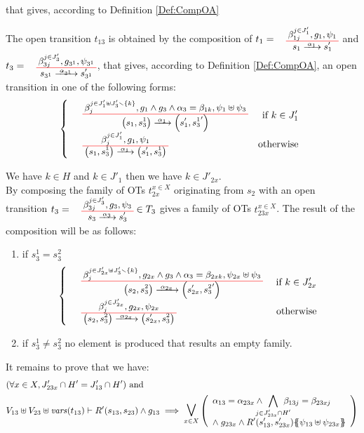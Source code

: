 \documentclass[runningheads]{llncs}
\begin{document}
\begin{enumerate}
\newpage

 that gives,  according to Definition \ref{Def:CompOA}

The open transition $t_{13}$ is obtained by the composition of $t_1=\OTx{1}{}{1}{1}$ and $t_3=\OTx{3^1}{}{3}{3}$, that gives,  according to Definition \ref{Def:CompOA}, an open transition in one of the following forms:
\[
\choice{
\OT{\mpar{s_1, s^1_3}}{\mpar{s'_1, {s^1_3}'}}{\alpha_1}{\beta_j^{j \in J'_1 \uplus J'_3 \setminus \{k\}}}{g_1 \wedge g_3 \wedge \alpha_3 = \beta_{1k}}{\psi_1 \uplus \psi_3} & \text{ if } k \in J'_{1} \\
\OT{\mpar{s_1, s^1_3}}{\mpar{s'_1, s^1_3}}{\alpha_1}{\beta_j^{j \in J'_1}}{g_1}{\psi_1}& \text{otherwise}
}
\]


We have  $k \in H$ and $k \in J'_{1}$ then  we have $k \in J'_{2x}$.\\
By composing the family of OTs  $t_{2x}^{x\in X}$ originating from  $s_2$ with an open transition $t_3=\OTx{3}{}{3}{3} \in T_3$
gives a family of OTs $t_{23x}^{x\in X}$.  The result of the composition will be as follows:
\begin{enumerate}
\item if $ s^1_3=s^2_3$
\[
\choice{
\OT{\mpar{s_2, s^2_3}}{\mpar{s'_{2x}, {s^2_3}'}}{\alpha_{2x}}{\beta_j^{j \in J'_{2x} \uplus J'_3 \setminus \{k\}}}{g_{2x} \wedge g_3 \wedge \alpha_3 = \beta_{2xk}}{\psi_{2x} \uplus \psi_3} & \text{ if } k \in J'_{2x} \\
\OT{\mpar{s_2, s^2_3}}{\mpar{s'_{2x}, s^2_3}}{\alpha_{2x}}{\beta_j^{j \in J'_{2x}}}{g_{2x}}{\psi_{2x}}& \text{otherwise}
}
\]
\item if $s^1_3 \neq s^2_3$ no element is produced that results an empty family.
\end{enumerate}

It remains to prove that we have:
\begin{align*}		
		&\mpar{\forall x \in X, J'_{23x} \cap H' = J'_{13} \cap H'} \text{ and }\\
		&  V_{13} \uplus V_{23} \uplus \fvars{t_{13}} \vdash R'\mpar{s_{13}, s_{23}} \wedge g_{13} \implies \operatorname*{\bigsymb{\bigvee}}_{x \in X} \mpar{\everymath{\displaystyle}\begin{array}{l}
			\alpha_{13} = \alpha_{23x} \wedge \bigwedge_\subbox{j \in J'_{23x} \cap H'} \beta_{13j} = \beta_{23xj} \\[12pt]
			\nwedge g_{23x} \wedge R'\mpar{s'_{13}, s'_{23x}}\psubst{\psi_{13} \uplus \psi_{23x}}
		\end{array}} 
	\end{align*}
	

\end{enumerate}
\end{document}
